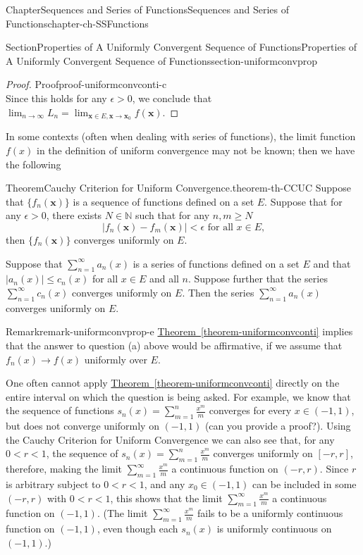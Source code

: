 \documentclass[oneside,10pt,]{book}
\newcommand{\xreffont}{\relax}
\numberwithin{equation}{section}
\newcommand{\bx}{\mathbf{x}}
\newcommand{\bbN}{\mathbb{N}}
\newcommand{\lt}{<}
\newcommand{\gt}{>}
\begin{document}
\begin{chapterptx}{Chapter}{Sequences and Series of Functions}{}{Sequences and Series of Functions}{}{}{chapter-ch-SSFunctions}
\begin{sectionptx}{Section}{Properties of A Uniformly Convergent Sequence of Functions}{}{Properties of A Uniformly Convergent Sequence of Functions}{}{}{section-uniformconvprop}
\begin{proof}{Proof}{}{proof-uniformconvconti-c}
\begin{equation*}
\end{equation*}
Since this holds for any \(\epsilon \gt 0\), we conclude that \(\lim_{n\to \infty} L_n=\lim_{\bx \in E, \bx\to \bx_0}f(\bx)\).%
\end{proof}
In some contexts (often when dealing with series of functions), the limit function \(f(x)\) in the definition of uniform convergence may not be known; then  we have the following%
\begin{theorem}{Theorem}{Cauchy Criterion for Uniform Convergence.}{}{theorem-th-CCUC}%
Suppose that \(\{f_n(\bx)\}\) is a sequence of  functions defined on a set \(E\). Suppose that for any \(\epsilon \gt 0\), there exists \(N\in \bbN\) such that for any \(n, m\ge N\)%
\begin{equation*}
\vert f_n(\bx)-f_m(\bx)\vert \lt \epsilon \text{ for all $x\in E$,}
\end{equation*}
then \(\{f_n(\bx)\}\) converges uniformly on \(E\).%
\par
Suppose that \(\sum_{n=1}^{\infty}a_n(x)\) is a series of functions defined on a set \(E\)  and that \(\vert a_n(x)\vert \le c_n(x)\) for all \(x\in E\) and all \(n\). Suppose further that the series \(\sum_{n=1}^{\infty}c_n(x)\) converges uniformly on \(E\). Then the series \(\sum_{n=1}^{\infty}a_n(x)\) converges uniformly on \(E\).%
\end{theorem}
\begin{remark}{Remark}{}{remark-uniformconvprop-e}%
\hyperref[theorem-uniformconvconti]{Theorem~{\xreffont\ref{theorem-uniformconvconti}}} implies that the answer to question (a) above would be affirmative, if we assume that \(f_{n}(x)\to f(x)\) uniformly over \(E\).%
\par
One often cannot apply  \hyperref[theorem-uniformconvconti]{Theorem~{\xreffont\ref{theorem-uniformconvconti}}} directly on the entire interval on which the question is being asked. For example, we know that the sequence of functions \(s_n(x)=\sum_{m=1}^n \frac{x^m}{m}\) converges for every \(x\in (-1,1)\), but does not converge uniformly on \((-1,1)\) (can you provide a proof?). Using the Cauchy Criterion for Uniform Convergence we can also see that, for any \(0< r <1\), the sequence of \(s_n(x)=\sum_{m=1}^n \frac{x^m}{m}\) converges uniformly on \([-r,r]\), therefore, making the limit \(\sum_{m=1}^{\infty} \frac{x^m}{m}\) a continuous function on \((-r,r)\). Since \(r\) is arbitrary subject to \(0< r <1\), and any \(x_0\in (-1,1)\) can be included in some \((-r,r)\) with \(0< r <1\), this shows that the limit \(\sum_{m=1}^{\infty} \frac{x^m}{m}\) a continuous function on \((-1, 1)\).  (The limit \(\sum_{m=1}^{\infty} \frac{x^m}{m}\) fails to be a uniformly continuous function on \((-1,1)\), even though each \(s_n(x)\) is uniformly continuous on \((-1,1)\).)%

\end{remark}
\end{sectionptx}
\end{chapterptx}
\end{document}
